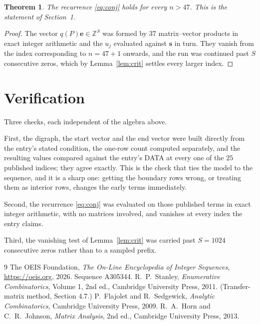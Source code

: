 \documentclass[11pt,a4paper]{article}
\theoremstyle{plain}
\newtheorem{theorem}{Theorem}
\theoremstyle{definition}
\begin{document}
\begin{theorem}
The recurrence \eqref{eq:conj} holds for every $n>47$. This is the statement of
Section~1.
\end{theorem}

\begin{proof}
The vector $q(P)\mathbf{e}\in\mathbb{Z}^{S}$ was formed by $37$ matrix--vector
products in exact integer arithmetic and the $u_j$ evaluated against $\mathbf{s}$ in turn.
They vanish from the index corresponding to $n=47+1$ onwards, and the run was continued
past $S$ consecutive zeros, which by Lemma~\ref{lem:crit} settles every larger index.
\end{proof}

\section{Verification}

Three checks, each independent of the algebra above.

First, the digraph, the start vector and the end vector were built directly from the
entry's stated condition, the one-row count computed separately, and the resulting values
compared against the entry's DATA at every one of the $25$ published indices; they
agree exactly. This is the check that ties the model to the sequence, and it is a sharp one:
getting the boundary rows wrong, or treating them as interior rows, changes the early terms
immediately.

Second, the recurrence \eqref{eq:conj} was evaluated on those published terms in exact
integer arithmetic, with no matrices involved, and vanishes at every index the entry claims.

Third, the vanishing test of Lemma~\ref{lem:crit} was carried past $S=1024$ consecutive
zeros rather than to a sampled prefix.

\begin{thebibliography}{9}
 The OEIS Foundation, \emph{The On-Line Encyclopedia of Integer
Sequences}, \url{https://oeis.org}, 2026. Sequence A305344.
 R.~P.~Stanley, \emph{Enumerative Combinatorics}, Volume 1, 2nd ed.,
Cambridge University Press, 2011. (Transfer-matrix method, Section 4.7.)
 P.~Flajolet and R.~Sedgewick, \emph{Analytic Combinatorics}, Cambridge
University Press, 2009.
 R.~A.~Horn and C.~R.~Johnson, \emph{Matrix Analysis}, 2nd ed., Cambridge
University Press, 2013.
\end{thebibliography}
\end{document}
